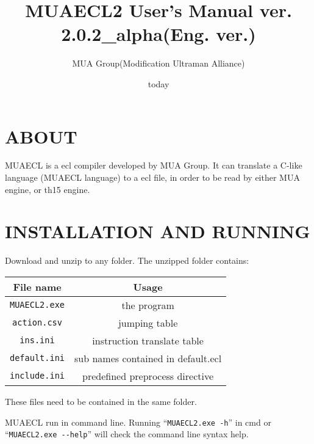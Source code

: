 \documentclass{article}
\author{MUA Group(Modification Ultraman Alliance)}
\title{MUAECL2 User's Manual  ver. 2.0.2\_alpha(Eng. ver.)}
\date{today}
\begin{document}
\maketitle
\tableofcontents
\clearpage

\section{ABOUT}

MUAECL is a ecl compiler developed by MUA Group. It can translate a C-like language (MUAECL language) to a ecl file, in order to be read by either MUA engine, or th15 engine.

\section{INSTALLATION AND RUNNING}

Download and unzip to any folder. The unzipped folder contains:

\begin{table}[H]
	\centering
	\begin{tabular}{c|c}
		\hline
		File name & Usage \\\hline
		\verb|MUAECL2.exe| & the program \\\hline
		\verb|action.csv| & jumping table \\\hline
		\verb|ins.ini| & instruction translate table \\\hline
		\verb|default.ini| & sub names contained in default.ecl \\\hline
		\verb|include.ini| & predefined preprocess directive \\\hline
	\end{tabular}
\end{table}

These files need to be contained in the same folder.

MUAECL run in command line. Running ``\verb|MUAECL2.exe -h|'' in cmd or ``\verb|MUAECL2.exe --help|'' will check the command line syntax help.
\end{document}
